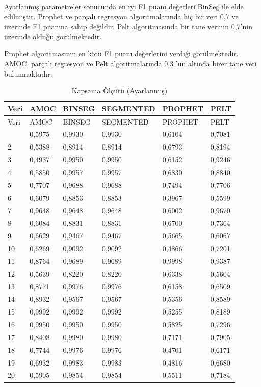 \documentclass[12pt,twoside]{deuthesis}
\begin{document}
Ayarlanmış parametreler sonucunda en iyi F1 puanı değerleri BinSeg ile elde edilmiştir. Prophet ve parçalı regresyon algoritmalarında hiç bir veri 0,7 ve üzerinde F1 puanına sahip değildir. Pelt algoritmasında bir tane verinin 0,7'nin üzerinde olduğu görülmektedir.

Prophet algoritmasının en kötü F1 puanı değerlerini verdiği görülmektedir. AMOC, parçalı regresyon ve Pelt algoritmalarında 0,3 'ün altında birer tane veri bulunmaktadır.

\begin{longtable}[]{@{}llllll@{}}
\caption{\label{tab:nvar11} Kapsama Ölçütü (Ayarlanmış)}\tabularnewline
\toprule\noalign{}
Veri & AMOC & BINSEG & SEGMENTED & PROPHET & PELT \\
\midrule\noalign{}
\endfirsthead
\toprule\noalign{}
Veri & AMOC & BINSEG & SEGMENTED & PROPHET & PELT \\
\midrule\noalign{}
\endhead
\bottomrule\noalign{}
\endlastfoot
1 & 0,5975 & 0,9930 & 0,9930 & 0,6104 & 0,7081 \\
2 & 0,5388 & 0,8914 & 0,8914 & 0,6793 & 0,8194 \\
3 & 0,4937 & 0,9950 & 0,9950 & 0,6152 & 0,9246 \\
4 & 0,5850 & 0,9957 & 0,9957 & 0,6830 & 0,8840 \\
5 & 0,7707 & 0,9688 & 0,9688 & 0,7494 & 0,7706 \\
6 & 0,6079 & 0,8853 & 0,8853 & 0,3967 & 0,5599 \\
7 & 0,9648 & 0,9648 & 0,9648 & 0,6002 & 0,9670 \\
8 & 0,6084 & 0,8831 & 0,8831 & 0,6700 & 0,7364 \\
9 & 0,6629 & 0,9467 & 0,9467 & 0,5665 & 0,6067 \\
10 & 0,6269 & 0,9092 & 0,9092 & 0,4866 & 0,7201 \\
11 & 0,8764 & 0,9689 & 0,9689 & 0,9998 & 0,9387 \\
12 & 0,5639 & 0,8220 & 0,8220 & 0,6338 & 0,5604 \\
13 & 0,8771 & 0,9976 & 0,9976 & 0,6158 & 0,6509 \\
14 & 0,8932 & 0,9567 & 0,9567 & 0,5356 & 0,8589 \\
15 & 0,9992 & 0,9992 & 0,9992 & 0,5255 & 0,8189 \\
16 & 0,9950 & 0,9950 & 0,9950 & 0,5825 & 0,7296 \\
17 & 0,8408 & 0,9980 & 0,9980 & 0,7171 & 0,7905 \\
18 & 0,7744 & 0,9976 & 0,9976 & 0,4701 & 0,6171 \\
19 & 0,6932 & 0,9983 & 0,9983 & 0,4816 & 0,6680 \\
20 & 0,5905 & 0,9854 & 0,9854 & 0,5511 & 0,7184 \\
\end{longtable}
\end{document}
